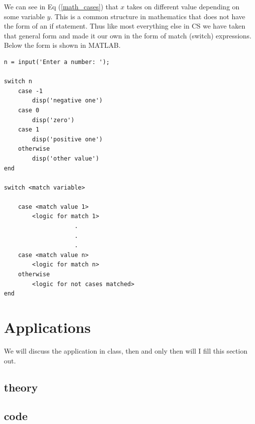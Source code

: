 \documentclass[12pt]{article}
\begin{document}
				We can see in Eq (\eqref{math_cases}) that $x$ takes on different value depending on some variable $y$.
				This is a common structure in mathematics that does not have the form of an if statement.
				Thus like most everything else in CS we have taken that general form and made it our own in the form of match (switch) expressions.
				Below the form is shown in MATLAB.

				\pagebreak

				\begin{lstlisting}[style=pseudocode]
n = input('Enter a number: ');

switch n
    case -1
        disp('negative one')
    case 0
        disp('zero')
    case 1
        disp('positive one')
    otherwise
        disp('other value')
end

switch <match variable>

	case <match value 1>
		<logic for match 1>
					.
					.
					.
	case <match value n>
		<logic for match n>
	otherwise
		<logic for not cases matched>
end
				\end{lstlisting}

	\section{Applications}
		We will discuss the application in class,
			then and only then will I fill this section out.
		\subsection{theory}
		\subsection{code}


	\nocite{*}

	\newpage %
	\backmatter
	\printbibliography

	\printnomenclature

	\newpage %
	\printindex

	\newpage %
	\appendix
\end{document}
